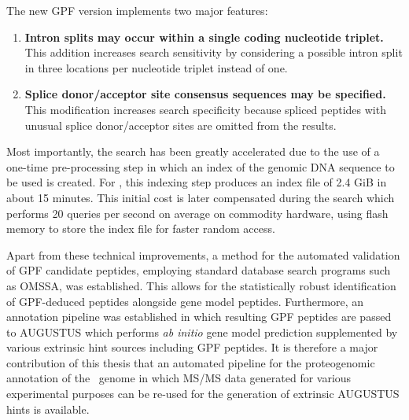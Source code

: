 The new GPF version implements two major features:

\begin{enumerate}
\item {\bf Intron splits may occur within a single coding nucleotide triplet.}
This addition increases search sensitivity by considering a possible intron
split in three locations per nucleotide triplet instead of one.

\item {\bf Splice donor/acceptor site consensus sequences may be specified.} 
This modification increases search specificity because spliced peptides with
unusual splice donor/acceptor sites are omitted from the results.
\end{enumerate}

Most importantly, the search has been greatly accelerated due to the use
of a one-time pre-processing step in which an index of the genomic DNA sequence
to be used is created.
For \cre, this indexing step produces an index file of 2.4 GiB in about 15 
minutes.
This initial cost is later compensated during the search which performs
20 queries per second on average on commodity hardware, using flash memory to 
store the index file for faster random access.

Apart from these technical improvements, a method for the automated validation 
of GPF candidate peptides, employing standard database search programs such as 
OMSSA, was established.
This allows for the statistically robust identification of GPF-deduced peptides
alongside gene model peptides.
Furthermore, an annotation pipeline was established in which resulting GPF
peptides are passed to AUGUSTUS which performs {\em ab initio} gene 
model prediction supplemented by various extrinsic hint sources including
GPF peptides.
It is therefore a major contribution of this thesis that an automated
pipeline for the proteogenomic annotation of the \cre~genome in which MS/MS 
data generated for various experimental purposes can be re-used for the 
generation of extrinsic AUGUSTUS hints is available.

